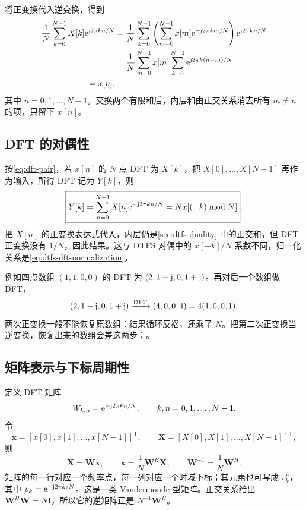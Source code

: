 将正变换代入逆变换，得到
\begin{align}
  \frac1N\sum_{k=0}^{N-1}X[k]\mathrm{e}^{\mathrm{j}2\pi kn/N}
  &=\frac1N\sum_{k=0}^{N-1}
    \left(\sum_{m=0}^{N-1}x[m]\mathrm{e}^{-\mathrm{j}2\pi km/N}\right)
    \mathrm{e}^{\mathrm{j}2\pi kn/N}\\
  &=\frac1N\sum_{m=0}^{N-1}x[m]
    \sum_{k=0}^{N-1}\mathrm{e}^{\mathrm{j}2\pi k(n-m)/N}\\
  =x[n],
  \label{eq:dft-inverse-proof}
\end{align}
其中 $n=0,1,\ldots,N-1$。交换两个有限和后，内层和由正交关系消去所有 $m\ne n$ 的项，只留下 $x[n]$。

\subsection{DFT 的对偶性}
\label{sec:dft-duality}

按\cref{eq:dft-pair}，若 $x[n]$ 的 $N$ 点 DFT 为 $X[k]$，把 $X[0],\ldots,X[N-1]$ 再作为输入，所得 DFT 记为 $Y[k]$，则
\begin{equation}
  \boxed{Y[k]=\sum_{n=0}^{N-1}X[n]\mathrm{e}^{-\mathrm{j}2\pi kn/N}
    =N x[(-k)\bmod N]}.
  \label{eq:dft-duality}
\end{equation}
把 $X[n]$ 的正变换表达式代入，内层仍是\cref{sec:dtfs-duality} 中的正交和，但 DFT 正变换没有 $1/N$，因此结果。这与 DTFS 对偶中的 $x[-k]/N$ 系数不同，归一化关系是\cref{eq:dtfs-dft-normalization}。

例如四点数组 $(1,1,0,0)$ 的 DFT 为 $(2,1-\mathrm{j},0,1+\mathrm{j})$。再对后一个数组做 DFT，
\[
  (2,1-\mathrm{j},0,1+\mathrm{j})
    \xrightarrow{\mathrm{DFT}}(4,0,0,4)
    =4(1,0,0,1).
\]
两次正变换一般不能恢复原数组：结果循环反褶，还乘了 $N$。把第二次正变换当逆变换，恢复出来的数组会差这两步；。

\subsection{矩阵表示与下标周期性}
\label{sec:dft-matrix}

定义 DFT 矩阵
\[
  W_{k,n}=\mathrm{e}^{-\mathrm{j}2\pi kn/N},\qquad k,n=0,1,\ldots,N-1.
\]
令
\[
  \mathbf{x}=[x[0],x[1],\ldots,x[N-1]]^{\mathsf T},\qquad
  \mathbf{X}=[X[0],X[1],\ldots,X[N-1]]^{\mathsf T},
\]
则
\begin{equation}
  \mathbf{X}=\mathbf{W}\mathbf{x},\qquad
  \mathbf{x}=\frac1N\mathbf{W}^{H}\mathbf{X},\qquad
  \mathbf{W}^{-1}=\frac1N\mathbf{W}^{H}.
  \label{eq:dft-matrix}
\end{equation}
矩阵的每一行对应一个频率点，每一列对应一个时域下标；其元素也可写成 $v_k^n$，其中 $v_k=\mathrm{e}^{-\mathrm{j}2\pi k/N}$。这是一类 Vandermonde 型矩阵。正交关系给出
$\mathbf W^H\mathbf W=N\mathbf I$，所以它的逆矩阵正是 $N^{-1}\mathbf W^H$。

